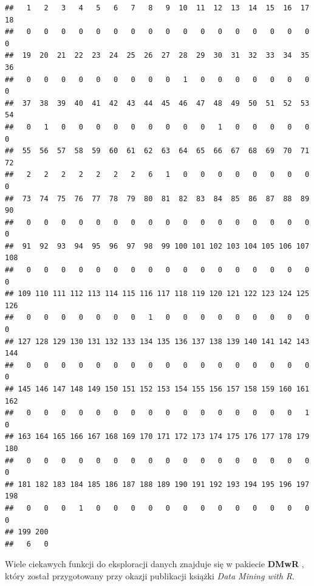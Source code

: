 \documentclass[]{book}
\newenvironment{Shaded}{\begin{snugshade}}{\end{snugshade}}
\newcommand{\CommentTok}[1]{\textcolor[rgb]{0.56,0.35,0.01}{\textit{#1}}}
\newcommand{\KeywordTok}[1]{\textcolor[rgb]{0.13,0.29,0.53}{\textbf{#1}}}
\newcommand{\NormalTok}[1]{#1}
\theoremstyle{plain}
\theoremstyle{definition}
\begin{document}
\begin{verbatim}
##   1   2   3   4   5   6   7   8   9  10  11  12  13  14  15  16  17  18 
##   0   0   0   0   0   0   0   0   0   0   0   0   0   0   0   0   0   0 
##  19  20  21  22  23  24  25  26  27  28  29  30  31  32  33  34  35  36 
##   0   0   0   0   0   0   0   0   0   1   0   0   0   0   0   0   0   0 
##  37  38  39  40  41  42  43  44  45  46  47  48  49  50  51  52  53  54 
##   0   1   0   0   0   0   0   0   0   0   0   1   0   0   0   0   0   0 
##  55  56  57  58  59  60  61  62  63  64  65  66  67  68  69  70  71  72 
##   2   2   2   2   2   2   2   6   1   0   0   0   0   0   0   0   0   0 
##  73  74  75  76  77  78  79  80  81  82  83  84  85  86  87  88  89  90 
##   0   0   0   0   0   0   0   0   0   0   0   0   0   0   0   0   0   0 
##  91  92  93  94  95  96  97  98  99 100 101 102 103 104 105 106 107 108 
##   0   0   0   0   0   0   0   0   0   0   0   0   0   0   0   0   0   0 
## 109 110 111 112 113 114 115 116 117 118 119 120 121 122 123 124 125 126 
##   0   0   0   0   0   0   0   1   0   0   0   0   0   0   0   0   0   0 
## 127 128 129 130 131 132 133 134 135 136 137 138 139 140 141 142 143 144 
##   0   0   0   0   0   0   0   0   0   0   0   0   0   0   0   0   0   0 
## 145 146 147 148 149 150 151 152 153 154 155 156 157 158 159 160 161 162 
##   0   0   0   0   0   0   0   0   0   0   0   0   0   0   0   0   1   0 
## 163 164 165 166 167 168 169 170 171 172 173 174 175 176 177 178 179 180 
##   0   0   0   0   0   0   0   0   0   0   0   0   0   0   0   0   0   0 
## 181 182 183 184 185 186 187 188 189 190 191 192 193 194 195 196 197 198 
##   0   0   0   1   0   0   0   0   0   0   0   0   0   0   0   0   0   0 
## 199 200 
##   6   0
\end{verbatim}

Wiele ciekawych funkcji do eksploracji danych znajduje się w pakiecie \textbf{DMwR} \citep{R-DMwR}, który został przygotowany przy okazji publikacji książki \emph{Data Mining with R}.

\begin{Shaded}
\end{Shaded}
\end{document}
